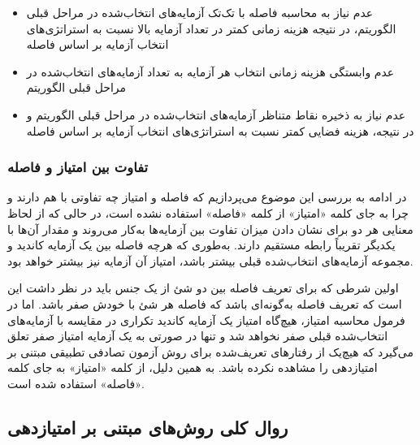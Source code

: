 \begin{itemize}
	\item عدم نیاز به محاسبه فاصله با تک‌تک آزمایه‌های انتخاب‌شده در مراحل قبلی الگوریتم، در نتیجه هزینه زمانی کمتر در تعداد آزمایه بالا نسبت به استراتژی‌های انتخاب آزمایه بر اساس فاصله
	\item عدم وابستگی هزینه زمانی انتخاب هر آزمایه به تعداد آزمایه‌های انتخاب‌شده در مراحل قبلی الگوریتم
	\item عدم نیاز به ذخیره نقاط متناظر آزمایه‌های انتخاب‌شده در مراحل قبلی الگوریتم و در نتیجه، هزینه فضایی کمتر نسبت به استراتژی‌های انتخاب آزمایه بر اساس فاصله
\end{itemize}


\subsubsection{تفاوت بین امتیاز و فاصله}

در ادامه به بررسی این موضوع می‌پردازیم که فاصله و امتیاز چه تفاوتی با هم دارند و چرا به جای کلمه «امتیاز» از کلمه «فاصله» استفاده نشده است، در حالی که از لحاظ معنایی هر دو برای نشان دادن میزان تفاوت بین آزمایه‌ها به‌کار می‌روند و مقدار آن‌ها با یکدیگر تقریباً رابطه مستقیم دارند. به‌طوری که هرچه فاصله بین یک آزمایه کاندید و مجموعه آزمایه‌های انتخاب‌شده قبلی بیشتر باشد، امتیاز آن آزمایه نیز بیشتر خواهد بود.

اولین شرطی که برای تعریف فاصله بین دو شئ از یک جنس باید در نظر داشت این است که تعریف فاصله به‌گونه‌ای باشد که فاصله هر شئ با خودش صفر باشد\cite{ciupa2006object}. اما در فرمول محاسبه امتیاز، هیچ‌گاه امتیاز یک آزمایه کاندید تکراری در مقایسه با آزمایه‌های انتخاب‌شده قبلی صفر نخواهد شد و تنها در صورتی به یک آزمایه امتیاز صفر تعلق می‌گیرد که هیچ‌یک از رفتارهای تعریف‌شده برای روش آزمون تصادفی تطبیقی مبتنی بر امتیازدهی را مشاهده نکرده باشد. به همین دلیل، از کلمه «امتیاز» به جای کلمه «فاصله» استفاده شده است.

\subsection{روال کلی روش‌های مبتنی بر امتیازدهی}


